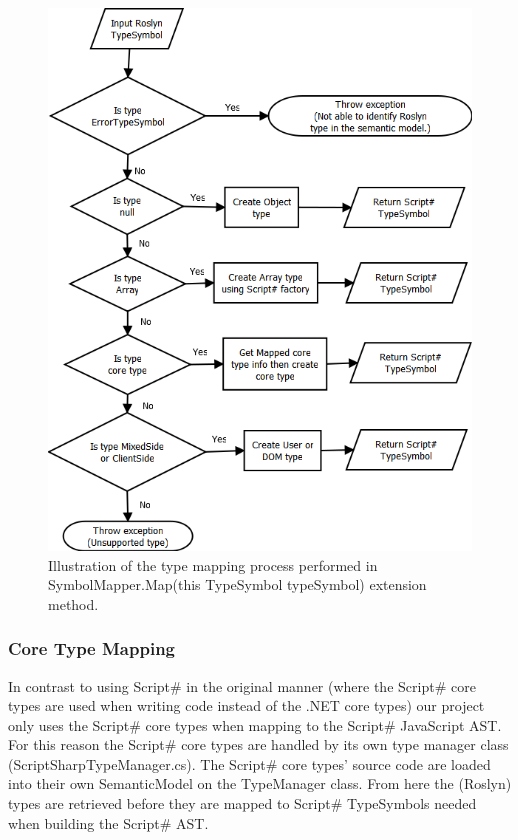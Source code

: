 			\begin{figure}
			\begin{center}
					\includegraphics[width=14cm]{resources/images/TypeMappingFlowchart.png}
					\end{center}
				\caption{Illustration of the type mapping process performed in SymbolMapper.Map(this TypeSymbol typeSymbol) extension method.}
				\label{typeMappingFlowchart}
			\end{figure}


		\subsubsection{Core Type Mapping} %
		\label{subsub:core:type_mapping}
			In contrast to using Script\# in the original manner (where the Script\# core types are used when writing code instead of the .NET core types) our project only uses the Script\# core types when mapping to the Script\# JavaScript AST. For this reason the Script\# core types are handled by its own type manager class (ScriptSharpTypeManager.cs). The Script\# core types’ source code are loaded into their own SemanticModel on the TypeManager class. From here the (Roslyn) types are retrieved before they are mapped to Script\# TypeSymbols needed when building the Script\# AST.

